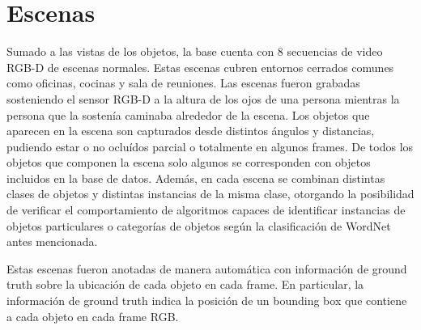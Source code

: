\section{Escenas}
Sumado a las vistas de los objetos, la base cuenta con 8 secuencias de video RGB-D de escenas normales. Estas escenas cubren entornos cerrados comunes como oficinas, cocinas y sala de reuniones. Las escenas fueron grabadas sosteniendo el sensor RGB-D a la altura de los ojos de una persona mientras la persona que la sostenía caminaba alrededor de la escena. Los objetos que aparecen en la escena son capturados desde distintos ángulos y distancias, pudiendo estar o no ocluídos parcial o totalmente en algunos frames. De todos los objetos que componen la escena solo algunos se corresponden con objetos incluidos en la base de datos. Además, en cada escena se combinan distintas clases de objetos y distintas instancias de la misma clase, otorgando la posibilidad de verificar el comportamiento de algoritmos capaces de identificar instancias de objetos particulares o categorías de objetos según la clasificación de WordNet antes mencionada.

Estas escenas fueron anotadas de manera automática con información de ground truth sobre la ubicación de cada objeto en cada frame. En particular, la información de ground truth indica la posición de un bounding box que contiene a cada objeto en cada frame RGB.


